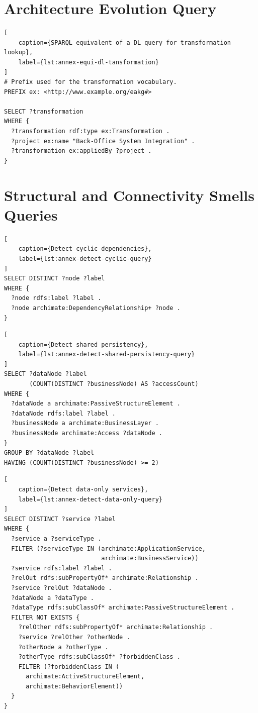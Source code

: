 \section{Architecture Evolution Query}
\label{sec:annex-archi-evo-queries}

\begin{lstlisting}[
	caption={SPARQL equivalent of a DL query for transformation lookup},
	label={lst:annex-equi-dl-tansformation}
]
# Prefix used for the transformation vocabulary.
PREFIX ex: <http://www.example.org/eakg#>

SELECT ?transformation
WHERE {
  ?transformation rdf:type ex:Transformation .
  ?project ex:name "Back-Office System Integration" .
  ?transformation ex:appliedBy ?project .
}
\end{lstlisting}

\section{Structural and Connectivity Smells Queries}
\label{sec:annex-structural-connectivity-smells-queries}

\begin{lstlisting}[
	caption={Detect cyclic dependencies},
	label={lst:annex-detect-cyclic-query}
]
SELECT DISTINCT ?node ?label
WHERE {
  ?node rdfs:label ?label .
  ?node archimate:DependencyRelationship+ ?node .
}
\end{lstlisting}

\begin{lstlisting}[
	caption={Detect shared persistency},
	label={lst:annex-detect-shared-persistency-query}
]
SELECT ?dataNode ?label
       (COUNT(DISTINCT ?businessNode) AS ?accessCount)
WHERE {
  ?dataNode a archimate:PassiveStructureElement .
  ?dataNode rdfs:label ?label .
  ?businessNode a archimate:BusinessLayer .
  ?businessNode archimate:Access ?dataNode .
}
GROUP BY ?dataNode ?label
HAVING (COUNT(DISTINCT ?businessNode) >= 2)
\end{lstlisting}

\begin{lstlisting}[
	caption={Detect data-only services},
	label={lst:annex-detect-data-only-query}
]
SELECT DISTINCT ?service ?label
WHERE {
  ?service a ?serviceType .
  FILTER (?serviceType IN (archimate:ApplicationService,
                           archimate:BusinessService))
  ?service rdfs:label ?label .
  ?relOut rdfs:subPropertyOf* archimate:Relationship .
  ?service ?relOut ?dataNode .
  ?dataNode a ?dataType .
  ?dataType rdfs:subClassOf* archimate:PassiveStructureElement .
  FILTER NOT EXISTS {
    ?relOther rdfs:subPropertyOf* archimate:Relationship .
    ?service ?relOther ?otherNode .
    ?otherNode a ?otherType .
    ?otherType rdfs:subClassOf* ?forbiddenClass .
    FILTER (?forbiddenClass IN (
      archimate:ActiveStructureElement,
      archimate:BehaviorElement))
  }
}
\end{lstlisting}

